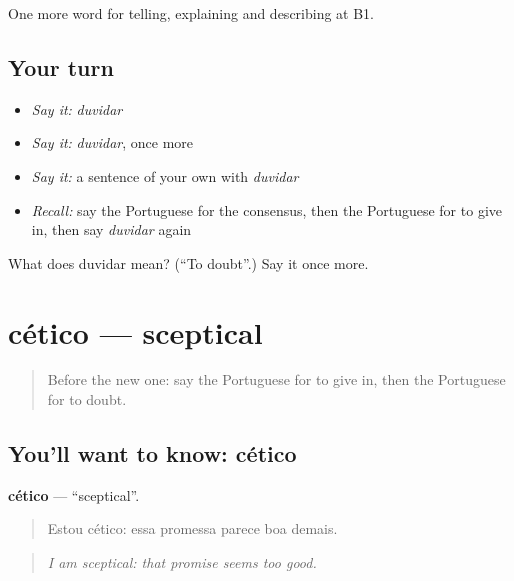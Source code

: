 \begin{grammarlens}[title={What you've built}]
One more word for telling, explaining and describing at B1.
\end{grammarlens}

\subsection*{Your turn}
\begin{itemize}
\raggedright
  \item \emph{Say it:} \emph{duvidar}
  \item \emph{Say it:} \emph{duvidar}, once more
  \item \emph{Say it:} a sentence of your own with \emph{duvidar}
  \item \emph{Recall:} say the Portuguese for the consensus, then the Portuguese for to give in, then say \emph{duvidar} again
\end{itemize}

\begin{tcolorbox}[breakable,colback=teal!4,colframe=teal!35!black,title={Before you move on}]
What does duvidar mean? (\textquotedblleft{}To doubt\textquotedblright{}.) Say it once more.
\end{tcolorbox}
\section[cético]{cético — sceptical}

\label{lesson:PT-C340-cetico}



\begin{quote}
Before the new one: say the Portuguese for to give in, then the Portuguese for to doubt.
\end{quote}

\subsection*{You'll want to know: cético}
\textbf{cético} — \textquotedblleft{}sceptical\textquotedblright{}.

\begin{quote}
Estou cético: essa promessa parece boa demais.
\end{quote}

\begin{quote}
\emph{I am sceptical: that promise seems too good.}
\end{quote}

